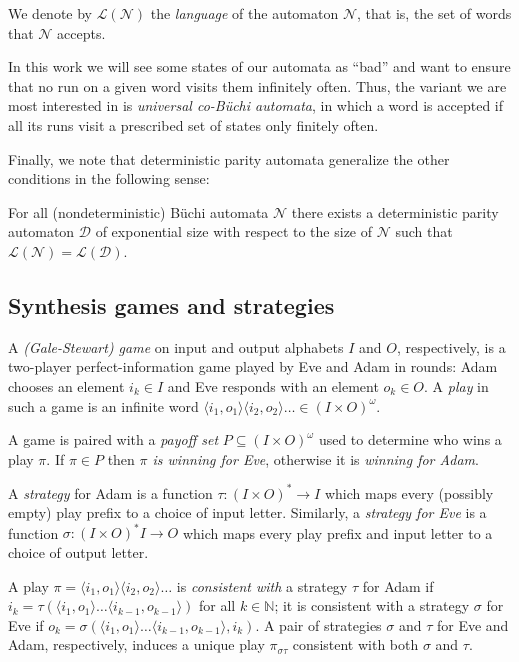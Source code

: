 \documentclass[runningheads,a4paper,draft]{llncs}
\newcommand{\eve}{Eve\xspace}
\newcommand{\adam}{Adam\xspace}
\newcommand{\calN}{\mathcal{N}}
\newcommand{\calD}{\mathcal{D}}
\renewcommand{\lang}[1]{\mathcal{L}({#1})}
\newcommand{\out}[2]{\pi_{#1#2}}
\begin{document}
We denote by $\lang{\calN}$ the \emph{language} of the automaton $\calN$, that
is, the set of words that $\calN$ accepts.

In this work we will see some states of our automata as ``bad'' and want to
ensure that no run on a given word visits them infinitely often.  Thus, the
variant we are most interested in is \emph{universal co-Büchi automata}, in
which a word is accepted if all its runs visit a prescribed set of states only
finitely often.

Finally, we note that deterministic parity automata generalize the other
conditions in the following sense:
\begin{proposition}\label{prop:paritymr}
  For all (nondeterministic) B\"uchi automata $\calN$ there exists a
  deterministic parity automaton $\calD$ of exponential size with respect to the
  size of $\calN$ such that $\lang{\calN} = \lang{\calD}$.
\end{proposition}

\subsection{Synthesis games and strategies}
\begin{definition}[Games]
  A \emph{(Gale-Stewart) game} on input and output alphabets $I$ and $O$,
  respectively, is a two-player perfect-information game played by \eve and
  \adam in rounds: \adam chooses an element $i_k \in I$ and \eve responds with
  an element $o_k \in O$. A \emph{play} in such a game is an infinite word
  $\langle i_1, o_1\rangle \langle i_2, o_2\rangle \dots \in (I\times O)^\omega$. 
\end{definition}
A game is paired with a \emph{payoff set} $P \subseteq (I \times
O)^\omega$ used to determine who wins a play $\pi$. If $\pi \in P$ then
\emph{$\pi$ is winning for \eve}, otherwise it is \emph{winning for \adam}.

\begin{definition}[Strategies]
  A \emph{strategy} for \adam is a function $\tau\colon (I \times O)^*
  \to I$ which maps every (possibly empty) play prefix
  to a choice of input letter.  Similarly, a \emph{strategy for \eve}
  is a function $\sigma\colon (I \times O)^* I \to O$ which maps every play prefix
  and input letter to a choice of output letter.
\end{definition}
A play $\pi = \langle i_1, o_1\rangle \langle i_2, o_2\rangle \dots$ is
\emph{consistent with} a strategy $\tau$ for \adam if $i_k = \tau( \langle
i_1, o_1\rangle \dots \langle i_{k-1}, o_{k-1}\rangle)$ for all $k \in
\mathbb{N}$; it is consistent with a strategy $\sigma$ for \eve if $o_k =
\sigma( \langle i_1, o_1\rangle \dots \langle i_{k-1}, o_{k-1}\rangle,
i_{k})$.  A pair of strategies $\sigma$ and $\tau$ for \eve and \adam,
respectively, induces a unique play $\out{\sigma}{\tau}$ consistent with both
$\sigma$ and $\tau$.
\end{document}
